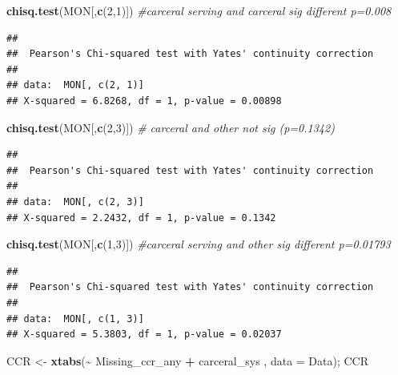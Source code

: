 \documentclass[
]{article}
\newenvironment{Shaded}{\begin{snugshade}}{\end{snugshade}}
\newcommand{\AttributeTok}[1]{\textcolor[rgb]{0.13,0.29,0.53}{#1}}
\newcommand{\CommentTok}[1]{\textcolor[rgb]{0.56,0.35,0.01}{\textit{#1}}}
\newcommand{\DecValTok}[1]{\textcolor[rgb]{0.00,0.00,0.81}{#1}}
\newcommand{\FunctionTok}[1]{\textcolor[rgb]{0.13,0.29,0.53}{\textbf{#1}}}
\newcommand{\NormalTok}[1]{#1}
\newcommand{\OtherTok}[1]{\textcolor[rgb]{0.56,0.35,0.01}{#1}}
\newcommand{\SpecialCharTok}[1]{\textcolor[rgb]{0.81,0.36,0.00}{\textbf{#1}}}
\begin{document}
\begin{Shaded}
\begin{Highlighting}[]
\FunctionTok{chisq.test}\NormalTok{(MON[,}\FunctionTok{c}\NormalTok{(}\DecValTok{2}\NormalTok{,}\DecValTok{1}\NormalTok{)]) }\CommentTok{\#carceral serving and carceral sig different p=0.008}
\end{Highlighting}
\end{Shaded}

\begin{verbatim}
## 
##  Pearson's Chi-squared test with Yates' continuity correction
## 
## data:  MON[, c(2, 1)]
## X-squared = 6.8268, df = 1, p-value = 0.00898
\end{verbatim}

\begin{Shaded}
\begin{Highlighting}[]
\FunctionTok{chisq.test}\NormalTok{(MON[,}\FunctionTok{c}\NormalTok{(}\DecValTok{2}\NormalTok{,}\DecValTok{3}\NormalTok{)]) }\CommentTok{\# carceral and other not sig (p=0.1342)}
\end{Highlighting}
\end{Shaded}

\begin{verbatim}
## 
##  Pearson's Chi-squared test with Yates' continuity correction
## 
## data:  MON[, c(2, 3)]
## X-squared = 2.2432, df = 1, p-value = 0.1342
\end{verbatim}

\begin{Shaded}
\begin{Highlighting}[]
\FunctionTok{chisq.test}\NormalTok{(MON[,}\FunctionTok{c}\NormalTok{(}\DecValTok{1}\NormalTok{,}\DecValTok{3}\NormalTok{)]) }\CommentTok{\#carceral serving and other sig different p=0.01793}
\end{Highlighting}
\end{Shaded}

\begin{verbatim}
## 
##  Pearson's Chi-squared test with Yates' continuity correction
## 
## data:  MON[, c(1, 3)]
## X-squared = 5.3803, df = 1, p-value = 0.02037
\end{verbatim}

\begin{Shaded}
\begin{Highlighting}[]
\NormalTok{CCR }\OtherTok{\textless{}{-}} \FunctionTok{xtabs}\NormalTok{(}\SpecialCharTok{\textasciitilde{}}\NormalTok{ Missing\_ccr\_any }\SpecialCharTok{+}\NormalTok{ carceral\_sys , }\AttributeTok{data =}\NormalTok{ Data); CCR}
\end{Highlighting}
\end{Shaded}
\end{document}
